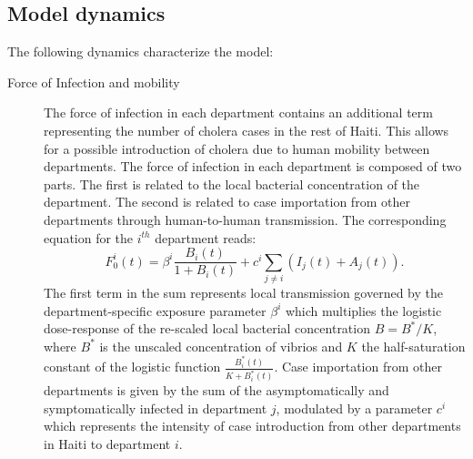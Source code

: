 \subsection{Model dynamics} 
The following dynamics characterize the model:
\begin{description}

    \item[Force of Infection and mobility] The force of infection in each department contains an additional term representing the number of cholera cases in the rest of Haiti. This allows for a possible introduction of cholera due to  human mobility between departments. The force of infection in each department is composed of two parts. The first is related to the local bacterial concentration of the department. The second is related to case importation from other departments through human-to-human transmission. The corresponding equation for the $i^{th}$ department reads:
    \begin{equation*}
    F^i_0(t)=\beta^i\frac{B_i(t)}{1+B_i(t)}+c^i \sum_{j\ne i} (I_j(t)+A_j(t)).
    \end{equation*}
    The first term in the sum represents local transmission governed by the department-specific exposure parameter $\beta^i$ which multiplies the logistic dose-response of the re-scaled local bacterial concentration $B = B^*/K$, where $B^*$ is the unscaled concentration of vibrios and $K$ the half-saturation constant of the logistic function $\frac{B^*_i(t)}{K+B^*_i(t)}$.
    Case importation from other departments is given by the sum of the asymptomatically and symptomatically infected in department $j$, modulated by a parameter $c^i$ which represents the intensity of case introduction from other departments in Haiti  to department $i$.

\end{description}
